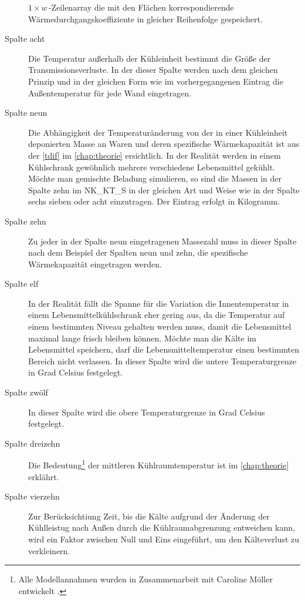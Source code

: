\begin{description}
	$1\times w\,$-Zeilenarray die mit den Flächen korrespondierende
	Wärmedurchgangskoeffiziente in gleicher Reihenfolge gespeichert.
	\item [{Spalte acht}] Die Temperatur außerhalb der K\"uhleinheit
	bestimmt die Größe der Transmissionsverluste. In der dieser Spalte
	werden nach dem gleichen Prinzip und in der gleichen Form wie im
	vorhergegangenen Eintrag die Außentemperatur für jede Wand eingetragen.
	\item [{Spalte neun}] Die Abhängigkeit der Temperaturänderung von der in
	einer K\"uhleinheit deponierten Masse an Waren und deren spezifische
	Wärmekapazität ist aus der \cref{tdif} im \cref{chap:theorie}
	ersichtlich. In der Realität werden in einem Kühlschrank gewöhnlich
	mehrere verschiedene Lebensmittel gekühlt. Möchte man gemischte Beladung
	simulieren, so sind die Massen in der Spalte zehn im NK\_KT\_S in der
	gleichen Art und Weise wie in der Spalte sechs sieben oder acht
	einzutragen. Der Eintrag erfolgt in Kilogramm.
	\item [{Spalte zehn}] Zu jeder in der Spalte neun eingetragenen
	Massezahl muss in dieser Spalte nach dem Beispiel der Spalten neun und
	zehn, die spezifische Wärmekapazität eingetragen werden.
	\item [{Spalte elf}] In der Realität fällt die Spanne für die Variation
	die Innentemperatur in einem Lebensmittelkühlschrank eher gering aus, da
	die Temperatur auf einem bestimmten Niveau gehalten werden muss, damit
	die Lebensmittel maximal lange frisch bleiben können. Möchte man die
	Kälte im Lebensmittel speichern, darf die Lebensmitteltemperatur einen
	bestimmten Bereich nicht verlassen. In dieser Spalte wird die untere
	Temperaturgrenze in Grad Celsius festgelegt.
	\item [{Spalte zw\"olf}] In dieser Spalte wird die obere
	Temperaturgrenze in Grad Celsius festgelegt.
	\item [{Spalte dreizehn}] Die Bedeutung\footnote{ Alle Modellannahmen
	wurden in Zusammenarbeit mit Caroline M\"oller entwickelt \cite{caro}.}
	der mittleren Kühlraumtemperatur ist im \cref{chap:theorie} erkl\"ahrt.
	\item [{Spalte vierzehn}] Zur Ber\"ucksichtiung Zeit, bis die K\"alte
	aufgrund der \"Anderung der K\"uhlleistug nach Au\ss en durch die
	K\"uhlraumabgrenzung entweichen kann, wird ein Faktor zwischen Null
	und Eins eingef\"uhrt, um den K\"alteverlust zu verkleinern.

\end{description}
